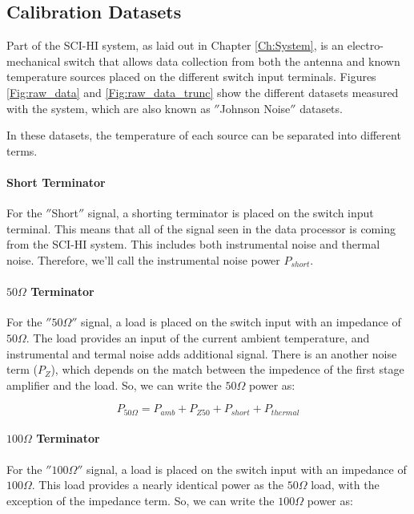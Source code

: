 \subsection{Calibration Datasets} \label{Sec:calsource}

Part of the SCI-HI system, as laid out in Chapter \ref{Ch:System}, is an electro-mechanical switch that allows data collection from both the antenna and known temperature sources placed on the different switch input terminals. Figures \ref{Fig:raw_data} and \ref{Fig:raw_data_trunc} show the different datasets measured with the system, which are also known as $''$Johnson Noise$''$ datasets. 

In these datasets, the temperature of each source can be separated into different terms. 

\paragraph{Short Terminator}

For the $''$Short$''$ signal, a shorting terminator is placed on the switch input terminal. This means that all of the signal seen in the data processor is coming from the SCI-HI system. This includes both instrumental noise and thermal noise. Therefore, we'll call the instrumental noise power $P_{short}$.

\paragraph{$50 \Omega$ Terminator}

For the $'' 50 \Omega ''$ signal, a load is placed on the switch input with an impedance of $50 \Omega$. The load provides an input of the current ambient temperature, and instrumental and termal noise adds additional signal. There is an another noise term ($P_Z$), which depends on the match between the impedence of the first stage amplifier and the load. So, we can write the $50 \Omega$ power as:

\begin{equation}
P_{50 \Omega} = P_{amb}+P_{Z50}+P_{short}+P_{thermal}
\end{equation}

\paragraph{$100 \Omega$ Terminator}

For the $'' 100 \Omega ''$ signal, a load is placed on the switch input with an impedance of $100 \Omega$. This load provides a nearly identical power as the $50 \Omega$ load, with the exception of the impedance term. So, we can write the $100 \Omega$ power as:

